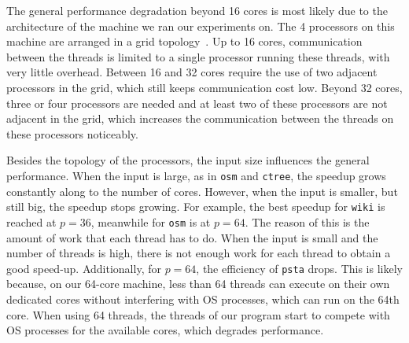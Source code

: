 The general performance degradation beyond 16 cores is most likely
due to the architecture of the machine we ran our experiments on. The
4 processors on this machine are arranged in a grid
topology~\cite{Drepper2007}. Up to 16 cores, communication between
the threads is limited to a single processor running these threads,
with very little overhead. Between 16 and 32 cores require the use
of two adjacent processors in the grid, which still keeps
communication cost low.  Beyond 32 cores, three or four processors
are needed and at least two of these processors are not adjacent in
the grid, which increases the communication between the threads on
these processors noticeably.

Besides the topology of the processors, the input size influences the general
performance. When the input is large, as in {\tt osm} and {\tt ctree}, the speedup
grows constantly along to the number of cores. However, when the input is smaller, but
still big, the speedup stops growing. For example, the best speedup for
{\tt wiki} is reached at $p=36$, meanwhile for {\tt osm} is at $p=64$. The reason
of this is the amount of work that each thread has to do. When the input is small and
the number of threads is high, there is not enough work for each thread to
obtain a good speed-up. Additionally, for $p = 64$, the efficiency of {\tt psta} drops.
This is likely because, on our 64-core machine, less than
64 threads can execute on their own dedicated cores without
interfering with OS processes, which can run on the 64th core. When
using 64 threads, the threads of our program start to compete with OS
processes for the available cores, which degrades performance.
%
%	
